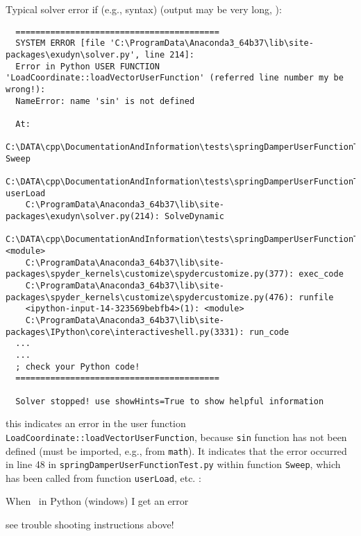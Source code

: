 \ei
\item Typical solver error if (e.g., syntax)  (output may be very long, ):
\begin{lstlisting}
  =========================================
  SYSTEM ERROR [file 'C:\ProgramData\Anaconda3_64b37\lib\site-packages\exudyn\solver.py', line 214]: 
  Error in Python USER FUNCTION 'LoadCoordinate::loadVectorUserFunction' (referred line number my be wrong!):
  NameError: name 'sin' is not defined

  At:
    C:\DATA\cpp\DocumentationAndInformation\tests\springDamperUserFunctionTest.py(48): Sweep
    C:\DATA\cpp\DocumentationAndInformation\tests\springDamperUserFunctionTest.py(54): userLoad
    C:\ProgramData\Anaconda3_64b37\lib\site-packages\exudyn\solver.py(214): SolveDynamic
    C:\DATA\cpp\DocumentationAndInformation\tests\springDamperUserFunctionTest.py(106): <module>
    C:\ProgramData\Anaconda3_64b37\lib\site-packages\spyder_kernels\customize\spydercustomize.py(377): exec_code
    C:\ProgramData\Anaconda3_64b37\lib\site-packages\spyder_kernels\customize\spydercustomize.py(476): runfile
    <ipython-input-14-323569bebfb4>(1): <module>
    C:\ProgramData\Anaconda3_64b37\lib\site-packages\IPython\core\interactiveshell.py(3331): run_code
  ...
  ...
  ; check your Python code!
  =========================================

  Solver stopped! use showHints=True to show helpful information
\end{lstlisting}
%
\bi
\item[$\ra$] this indicates an error in the user function \texttt{LoadCoordinate::loadVectorUserFunction}, because \texttt{sin} function has not been defined (must be imported, e.g., from \texttt{math}). It indicates that the error occurred in line 48 in \texttt{springDamperUserFunctionTest.py} within function \texttt{Sweep}, which has been called from function \texttt{userLoad}, etc.
\ei
\ei \vspace{12pt}
:
\bn
\item When  \codeName\ in Python (windows) I get an error 
\bi
\item[$\ra$] see trouble shooting instructions above!
